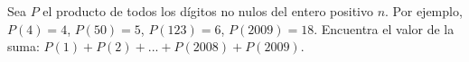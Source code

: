 Sea $ P$ el producto de todos los dígitos no nulos del entero positivo $ n$. Por ejemplo, $ P(4) = 4$, $ P(50) = 5$, $ P(123) = 6$, $ P(2009) = 18$. 
Encuentra el valor de la suma: $P(1) + P(2) + ... + P(2008) + P(2009)$.
